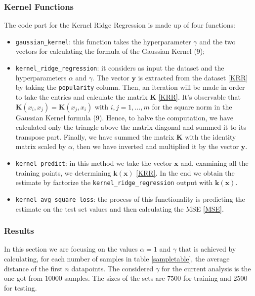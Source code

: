 \documentclass{article}
\begin{document}
\subsubsection{Kernel Functions}
\label{subsubsec:kernelfunc}
The code part for the Kernel Ridge Regression is made up of four functions:
\begin{itemize}
	\item \texttt{gaussian\_kernel}: this function takes the hyperparameter $\gamma$ and the two vectors for calculating the formula of the Gaussian Kernel (9);

	\item \texttt{kernel\_ridge\_regression}: it considers as input the dataset and the hyperparameters $\alpha$ and $\gamma$. 
        The vector $\boldsymbol{y}$ is extracted from the dataset \eqref{KRR} by taking the \texttt{popularity} column. Then, an iteration will be made in order to take the entries and calculate the matrix $\boldsymbol{K}$ \eqref{KRR}. 
        It's observable that $\boldsymbol{K}(x_i, x_j) = \boldsymbol{K}(x_j, x_i)$ with $ i,j = 1, \dots, m$ for the square norm in the Gaussian Kernel formula (9). Hence, to halve the computation, we have calculated only the triangle above the matrix diagonal and summed it to its transpose part. Finally, we have summed the matrix $\boldsymbol{K}$ with the identity matrix scaled by $\alpha$, then we have inverted and multiplied it by the vector $\boldsymbol{y}$.
	\item \texttt{kernel\_predict}:
        in this method we take the vector $\boldsymbol{x}$ and, examining all the training points, we determining $\boldsymbol{k}(\boldsymbol{x})$ \eqref{KRR}. In the end we obtain the estimate by factorize the \texttt{kernel\_ridge\_regression} output with $\boldsymbol{k}(\boldsymbol{x})$. 
	\item \texttt{kernel\_avg\_square\_loss}: the process of this functionality is predicting the estimate on the test set values and then calculating the MSE \eqref{MSE}.  
\end{itemize}

\subsubsection{Results}
In this section we are focusing on the values $\alpha = 1$ and $\gamma$ that is achieved by calculating, for each number of samples in table \ref{sampletable}, the average distance of the first $n$ datapoints. The considered $\gamma$ for the current analysis is the one got from $10000$ samples. The sizes of the sets are $7500$ for training and $2500$ for testing.
\end{document}
